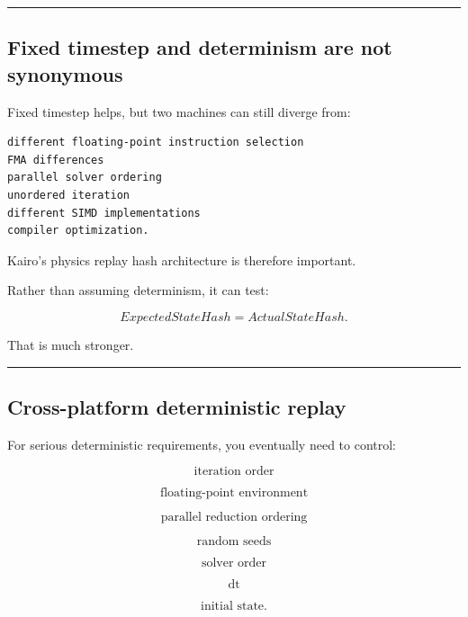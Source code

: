 \begin{center}\rule{0.5\linewidth}{0.5pt}\end{center}

\subsection{Fixed timestep and determinism are not synonymous}\label{06-engine-ii-ch037-fixed-timestep-and-determinism-are-not-synonymous}

\hypertarget{06-engine-ii-ch037-fixed-timestep-and-determinism-are-not-synonymous}{}

Fixed timestep helps, but two machines can still diverge from:

\begin{verbatim}
different floating-point instruction selection
FMA differences
parallel solver ordering
unordered iteration
different SIMD implementations
compiler optimization.
\end{verbatim}

Kairo's physics replay hash architecture is therefore important.

Rather than assuming determinism, it can test:

\[
ExpectedStateHash
=
ActualStateHash.
\]

That is much stronger.

\begin{center}\rule{0.5\linewidth}{0.5pt}\end{center}

\subsection{Cross-platform deterministic replay}\label{06-engine-ii-ch037-cross-platform-deterministic-replay}

\hypertarget{06-engine-ii-ch037-cross-platform-deterministic-replay}{}

For serious deterministic requirements, you eventually need to control:

\[
\text{iteration order}
\]

\[
\text{floating-point environment}
\]

\[
\text{parallel reduction ordering}
\]

\[
\text{random seeds}
\]

\[
\text{solver order}
\]

\[
\text{dt}
\]

\[
\text{initial state}.
\]

